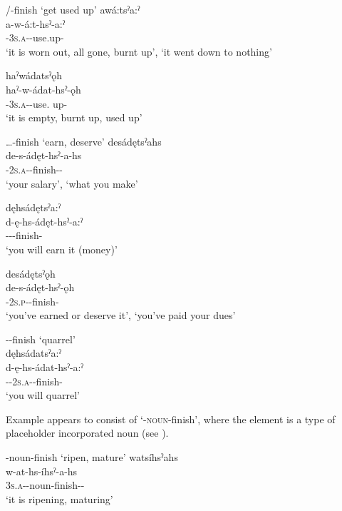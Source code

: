 \ea\label{ex:eventuative3}  {\semireflexive}/{}-finish ‘get used up’
\ea awá:tsˀa:ˀ \\
\gll a-w-á:t-hsˀ-a:ˀ\\
 {\factual}-\textsc{3s.a}-{\semireflexive}-use.up-{\punctual}\\
\glt ‘it is worn out, all gone, burnt up’, `it went down to nothing'

\ex haˀwádatsˀǫh\\
\gll haˀ-w-ádat-hsˀ-ǫh\\
 {\translocative}-\textsc{3s.a}-{}-use. up-{\stative}\\
\glt `it is empty, burnt up, used up'
\z
\z

\ea\label{ex:eventuative4}  \textsc{\dualic…}-finish ‘earn, deserve’
\ea desádętsˀahs \\
\gll de-s-ádęt-hsˀ-a-hs\\
 {\dualic}-\textsc{2s.a}-{}-finish-{\joinerA}-{\habitual}\\
\glt ‘your salary’, `what you make'

\ex dęhsádętsˀa:ˀ\\
\gll d-ę-hs-ádęt-hsˀ-a:ˀ\\
 {\dual}--{}-finish-{\punctual}\\
\glt `you will earn it (money)'

\ex desádętsˀǫh \\
\gll de-s-ádęt-hsˀ-ǫh\\
{\dualic}-\textsc{2s.p}-{}-finish-{\stative}\\
\glt ‘you’ve earned or deserve it’, ‘you’ve paid your dues’ 
\z
\z

\ea\label{ex:eventuative12}  {\dualic}--finish ‘quarrel’\\
dęhsádatsˀa:ˀ\\
\gll d-ę-hs-ádat-hsˀ-a:ˀ\\
 {\dualic}-{\future}-\textsc{2s.a}-{}-finish-{\punctual}\\
\glt `you will quarrel'
\z


Example  appears to consist of  ‘\textsc{\semireflexive-noun}-finish’, where the  element is a type of placeholder incorporated noun (see ).

\ea\label{ex:eventuative5}  {\semireflexive}-noun-finish ‘ripen, mature’
\ea watsíhsˀahs\\
\gll w-at-hs-íhsˀ-a-hs\\
 \textsc{3s.a}-{\semireflexive}-noun-finish-{\joinerA}-{\habitual}\\
\glt `it is ripening, maturing'

